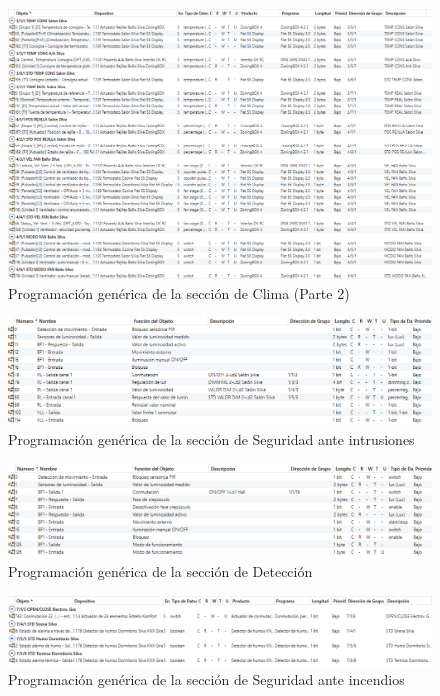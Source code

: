 \begin{landscape}
\begin{figure}[H]
\includegraphics[width=1.65\textwidth]{figures/prog_clima2.png}  
\caption{Programación genérica de la sección de Clima (Parte 2)}
\label{fig:prog_clima2}
\end{figure}

\begin{figure}[H]
\includegraphics[width=1.55\textwidth]{figures/prog_pres.png}   
\caption{Programación genérica de la sección de Seguridad ante intrusiones}
\label{fig:prog_pres}
\end{figure}

\begin{figure}[H]
\includegraphics[width=1.55\textwidth]{figures/prog_mov.png}   
\caption{Programación genérica de la sección de Detección}
\label{fig:prog_mov}
\end{figure}

\begin{figure}[H]
\includegraphics[width=1.55\textwidth]{figures/prog_humo.png}   
\caption{Programación genérica de la sección de Seguridad ante incendios}
\label{fig:prog_humo}
\end{figure}
 \vspace{2cm}


\end{landscape}
